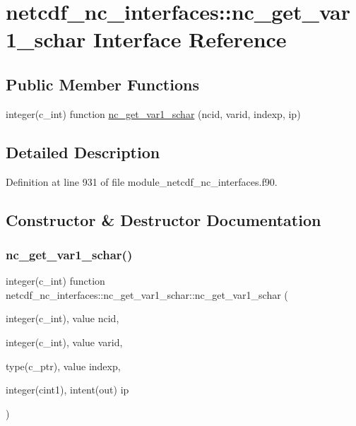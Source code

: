 \hypertarget{interfacenetcdf__nc__interfaces_1_1nc__get__var1__schar}{}\section{netcdf\+\_\+nc\+\_\+interfaces\+:\+:nc\+\_\+get\+\_\+var1\+\_\+schar Interface Reference}
\label{interfacenetcdf__nc__interfaces_1_1nc__get__var1__schar}
\subsection*{Public Member Functions}
\begin{DoxyCompactItemize}
\item 
integer(c\+\_\+int) function \hyperlink{interfacenetcdf__nc__interfaces_1_1nc__get__var1__schar_a03a1b16a09f59e96fe6b44cdc9d4e0b9}{nc\+\_\+get\+\_\+var1\+\_\+schar} (ncid, varid, indexp, ip)
\end{DoxyCompactItemize}


\subsection{Detailed Description}


Definition at line 931 of file module\+\_\+netcdf\+\_\+nc\+\_\+interfaces.\+f90.



\subsection{Constructor \& Destructor Documentation}
\mbox{\label{interfacenetcdf__nc__interfaces_1_1nc__get__var1__schar_a03a1b16a09f59e96fe6b44cdc9d4e0b9}} 
\subsubsection{\texorpdfstring{nc\+\_\+get\+\_\+var1\+\_\+schar()}{nc\_get\_var1\_schar()}}
{\footnotesize\ttfamily integer(c\+\_\+int) function netcdf\+\_\+nc\+\_\+interfaces\+::nc\+\_\+get\+\_\+var1\+\_\+schar\+::nc\+\_\+get\+\_\+var1\+\_\+schar (\begin{DoxyParamCaption}\item[{integer(c\+\_\+int), value}]{ncid,  }\item[{integer(c\+\_\+int), value}]{varid,  }\item[{type(c\+\_\+ptr), value}]{indexp,  }\item[{integer(cint1), intent(out)}]{ip }\end{DoxyParamCaption})}



